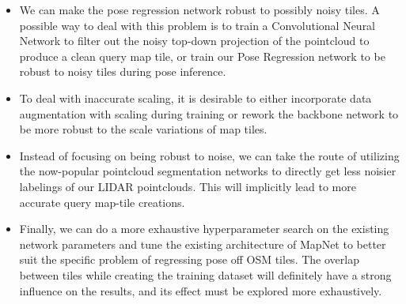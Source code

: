 \begin{itemize}
\item We can make the pose regression network robust to possibly noisy tiles. A possible way to deal with this problem is to train a Convolutional Neural Network to filter out the noisy top-down projection of the pointcloud to produce a clean query map tile, or train our Pose Regression network to be robust to noisy tiles during pose inference.
\\
\item To deal with inaccurate scaling, it is desirable to either incorporate data augmentation with scaling during training or rework the backbone network to be more robust to the scale variations of map tiles. 
\\
\item Instead of focusing on being robust to noise, we can take the route of utilizing the now-popular pointcloud segmentation networks to directly get less noisier labelings of our LIDAR pointclouds. This will implicitly lead to more accurate query map-tile creations.
\\
\item Finally, we can do a more exhaustive hyperparameter search on the existing network parameters and tune the existing architecture of MapNet to better suit the specific problem of regressing pose off OSM tiles. The overlap between tiles while creating the training dataset will definitely have a strong influence on the results, and its effect must be explored more exhaustively. 
\end{itemize}

